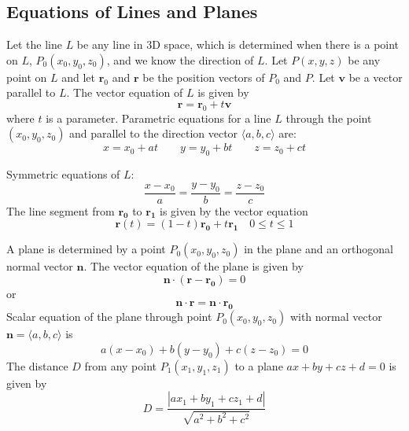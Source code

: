 \documentclass{article}
\begin{document}
    \subsection{Equations of Lines and Planes}
    \begin{outline}
        \1 Let the line $L$ be any line in 3D space, which is determined when there is a point on $L$, \(P_0(x_0,y_0,z_0)\), and we know the direction of $L$. Let \(P(x,y,z)\) be any point on $L$ and let \(\mathbf r_0\) and \(\mathbf r\) be the position vectors of \(P_0\) and \(P\). Let \(\mathbf v\) be a vector parallel to $L$. The vector equation of $L$ is given by \[\mathbf r=\mathbf r_0+t\mathbf v\] where $t$ is a parameter. 
        \1 Parametric equations for a line $L$ through the point \((x_0,y_0,z_0)\) and parallel to the direction vector \(\langle a,b,c\rangle\) are: \[x=x_0+at\qquad y=y_0+bt\qquad z=z_0+ct\]
    \end{outline}
        \begin{outline}
        \1 Symmetric equations of $L$: \[\dfrac{x-x_0}{a}=\dfrac{y-y_0}{b}=\dfrac{z-z_0}{c}\]
        \1 The line segment from \(\mathbf{r_0}\) to \(\mathbf{r_1}\) is given by the vector equation \[\mathbf r(t)=(1-t)\mathbf{r_0}+t\mathbf{r_1}\quad 0\leq t\leq 1\]
        \end{outline}\begin{outline}
        \1 A plane is determined by a point \(P_0(x_0,y_0,z_0)\) in the plane and an orthogonal normal vector \(\mathbf n\). The vector equation of the plane is given by \[\mathbf{n\cdot}(\mathbf{r}-\mathbf{r_0})=0\] or \[\mathbf{n\cdot r}=\mathbf{n\cdot r_0}\]
        \1 Scalar equation of the plane through point \(P_0(x_0,y_0,z_0)\) with normal vector \(\mathbf n=\langle a,b,c\rangle\) is \[a(x-x_0)+b(y-y_0)+c(z-z_0)=0\]
        \1 The distance $D$ from any point \(P_1(x_1,y_1,z_1)\) to a plane \(ax+by+cz+d=0\) is given by \[D=\dfrac{|ax_1+by_1+cz_1+d|}{\sqrt{a^2+b^2+c^2}}\]

    \end{outline}
\end{document}
